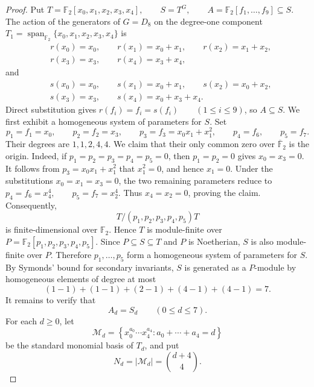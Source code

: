 \documentclass[10pt,a4paper]{amsart}
\newcommand{\Span}{\operatorname{span}}
\begin{document}
	\begin{proof}
	
Put $T=\mathbb F_{2}[x_{0},x_{1},x_{2},x_{3},x_{4}], \qquad S=T^{G}, \qquad A=\mathbb F_{2}[f_{1},\ldots,f_{9}]\subseteq S$. The action of the generators of \(G=D_{8}\) on the degree-one component \(T_{1}=\Span_{\mathbb F_2}\{x_0,x_1,x_2,x_3,x_4\}\) is
			\[
			\begin{aligned}
				&r(x_{0})=x_{0},\qquad
				r(x_{1})=x_{0}+x_{1},\qquad
				r(x_{2})=x_{1}+x_{2},\\
				&r(x_{3})=x_{3},\qquad
				r(x_{4})=x_{3}+x_{4},
			\end{aligned}
			\]
			and
			\[
			\begin{aligned}
				&s(x_{0})=x_{0},\qquad
				s(x_{1})=x_{0}+x_{1},\qquad
				s(x_{2})=x_{0}+x_{2},\\
				&s(x_{3})=x_{3},\qquad
				s(x_{4})=x_{0}+x_{3}+x_{4}.
			\end{aligned}
			\]
Direct substitution gives $r(f_i)=f_i=s(f_i) \qquad (1\leq i\leq 9)$, so \(A\subseteq S\). We first exhibit a homogeneous system of parameters for \(S\). Set
			\[
			p_{1}=f_{1}=x_{0},\qquad
			p_{2}=f_{2}=x_{3},\qquad
			p_{3}=f_{3}=x_{0}x_{1}+x_{1}^{2},
			\qquad
			p_{4}=f_{6},\qquad
			p_{5}=f_{7}.
			\]
			Their degrees are $1,1,2,4,4$. We claim that their only common zero over \(\overline{\mathbb F}_{2}\) is the origin. Indeed, if $p_{1}=p_{2}=p_{3}=p_{4}=p_{5}=0$, then \(p_{1}=p_{2}=0\) gives $x_{0}=x_{3}=0$. It follows from $p_{3}=x_{0}x_{1}+x_{1}^{2}$ that $x_{1}^{2}=0$, and hence \(x_{1}=0\). Under the substitutions
			\(x_{0}=x_{1}=x_{3}=0\), the two remaining parameters reduce to $p_{4}=f_{6}=x_{4}^{4}, \qquad p_{5}=f_{7}=x_{2}^{4}$. Thus \(x_{4}=x_{2}=0\), proving the claim. Consequently,
			\[
			T/(p_{1},p_{2},p_{3},p_{4},p_{5})T
			\]
			is finite-dimensional over \(\mathbb F_{2}\). Hence \(T\) is module-finite over $P=\mathbb F_{2}[p_{1},p_{2},p_{3},p_{4},p_{5}]$. Since \(P\subseteq S\subseteq T\) and \(P\) is Noetherian, \(S\) is also
			module-finite over \(P\). Therefore \(p_{1},\ldots,p_{5}\) form a homogeneous system of parameters for \(S\). By Symonds' bound for secondary invariants, \(S\) is generated as a
			\(P\)-module by homogeneous elements of degree at most
			\[
			(1-1)+(1-1)+(2-1)+(4-1)+(4-1)=7.
			\]
			It remains to verify that
			\[
			A_d=S_d\qquad(0\leq d\leq7).
			\]
			For each \(d\geq0\), let
			\[
			\mathcal M_d=
			\left\{x_0^{a_0}\cdots x_4^{a_4}:a_0+\cdots+a_4=d\right\}
			\]
			be the standard monomial basis of \(T_d\), and put
			\[
			N_d=|\mathcal M_d|=\binom{d+4}{4}.
\]
\end{proof}
\end{document}
